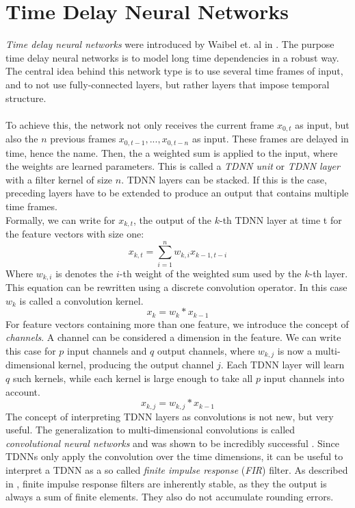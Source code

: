 
\section{Time Delay Neural Networks}
\label{sec:tdnn}

\textit{Time delay neural networks} were introduced by Waibel et. al in \cite{waibel1990phoneme}. The purpose time delay neural networks is to model long time dependencies in a robust way. The central idea behind this network type is to use several time frames of input, and to not use fully-connected layers, but rather layers that impose temporal structure. \\ \\
To achieve this, the network not only receives the current frame $x_{0,t}$ as input, but also the $n$ previous frames $x_{0,t - 1}, ..., x_{0,t - n}$ as input. These frames are delayed in time, hence the name. Then, the a weighted sum is applied to the input, where the weights are learned parameters. This is called a \textit{TDNN unit} or \textit{TDNN layer} with a filter kernel of size $n$. TDNN layers can be stacked. If this is the case, preceding layers have to be extended to produce an output that contains multiple time frames. \\
Formally, we can write for $x_{k,t}$, the output of the $k$-th TDNN layer at time t for the feature vectors with size one:
\[
x_{k,t} = \sum_{i = 1}^n w_{k, i} x_{k - 1, t - i}
\]
Where $w_{k, i}$ is denotes the $i$-th weight of the weighted sum used by the $k$-th layer. \\
This equation can be rewritten using a discrete convolution operator. In this case $w_k$ is called a convolution kernel. 
\[
x_{k} = w_{k} * x_{k - 1}
\]
For feature vectors containing more than one feature, we introduce the concept of \textit{channels}. A channel can be considered a dimension in the feature. We can write this case for $p$ input channels and $q$ output channels, where $w_{k, j}$ is now a multi-dimensional kernel, producing the output channel $j$. Each TDNN layer will learn $q$ such kernels, while each kernel is large enough to take all $p$ input channels into account. 
\[
x_{k,j} = w_{k, j} * x_{k - 1}
\]
The concept of interpreting TDNN layers as convolutions is not new, but very useful. The generalization to multi-dimensional convolutions is called \textit{convolutional neural networks} and was shown to be incredibly successful \cite{krizhevsky2012imagenet}. Since TDNNs only apply the convolution over the time dimensions, it can be useful to interpret a TDNN as a so called \textit{finite impulse response} (\textit{FIR}) filter. As described in \cite{leon2015signale}, finite impulse response filters are inherently stable, as they the output is always a sum of finite elements. They also do not accumulate rounding errors. \\
